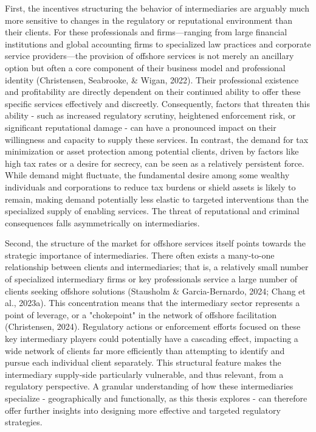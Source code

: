 First, the incentives structuring the behavior of intermediaries are arguably much more sensitive to changes in the regulatory or reputational environment than their clients. For these professionals and firms—ranging from large financial institutions and global accounting firms to specialized law practices and corporate service providers—the provision of offshore services is not merely an ancillary option but often a core component of their business model and professional identity (Christensen, Seabrooke, \& Wigan, 2022). Their professional existence and profitability are directly dependent on their continued ability to offer these specific services effectively and discreetly. Consequently, factors that threaten this ability - such as increased regulatory scrutiny, heightened enforcement risk, or significant reputational damage - can have a pronounced impact on their willingness and capacity to supply these services. In contrast, the demand for tax minimization or asset protection among potential clients, driven by factors like high tax rates or a desire for secrecy, can be seen as a relatively persistent force. While demand might fluctuate, the fundamental desire among some wealthy individuals and corporations to reduce tax burdens or shield assets is likely to remain, making demand potentially less elastic to targeted interventions than the specialized supply of enabling services. The threat of reputational and criminal consequences falls asymmetrically on intermediaries.

Second, the structure of the market for offshore services itself points towards the strategic importance of intermediaries. There often exists a many-to-one relationship between clients and intermediaries; that is, a relatively small number of specialized intermediary firms or key professionals service a large number of clients seeking offshore solutions (Stausholm \& Garcia-Bernardo, 2024; Chang et al., 2023a). This concentration means that the intermediary sector represents a point of leverage, or a "chokepoint" in the network of offshore facilitation (Christensen, 2024). Regulatory actions or enforcement efforts focused on these key intermediary players could potentially have a cascading effect, impacting a wide network of clients far more efficiently than attempting to identify and pursue each individual client separately. This structural feature makes the intermediary supply-side particularly vulnerable, and thus relevant, from a regulatory perspective. A granular understanding of how these intermediaries specialize - geographically and functionally, as this thesis explores - can therefore offer further insights into designing more effective and targeted regulatory strategies.




